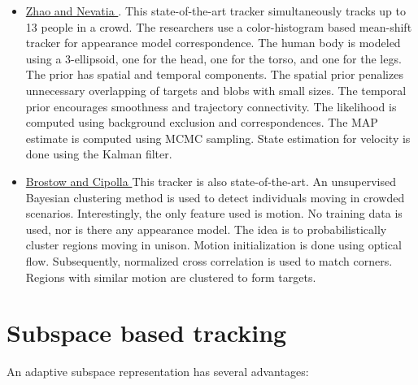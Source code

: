 \begin{itemize}
\item \underline{Zhao and Nevatia \cite{2004_CNF_TrackingPeople_Zhao}}.  This state-of-the-art tracker simultaneously tracks up to 13 people in a crowd.  The researchers use a color-histogram based mean-shift tracker for appearance model correspondence.  The human body is modeled using a 3-ellipsoid, one for the head, one for the torso, and one for the legs.  The prior has spatial and temporal components.  The spatial prior penalizes unnecessary overlapping of targets and blobs with small sizes.  The temporal prior encourages smoothness and trajectory connectivity.  The likelihood is computed using background exclusion and correspondences.  The MAP estimate is computed using MCMC sampling.  State estimation for velocity is done using the Kalman filter.

\item \underline{Brostow and Cipolla \cite{2006_CNF_TRKhuman_Brostow}}  This tracker is also state-of-the-art.  An unsupervised Bayesian clustering method is used to detect individuals moving in crowded scenarios.  Interestingly, the only feature used is motion.  No training data is used, nor is there any appearance model.  The idea is to probabilistically cluster regions moving in unison.  Motion initialization is done using optical flow.  Subsequently, normalized cross correlation is used to match corners.  Regions with similar motion are clustered to form targets.
\end{itemize}

\section{Subspace based tracking}
An adaptive subspace representation has several advantages:

